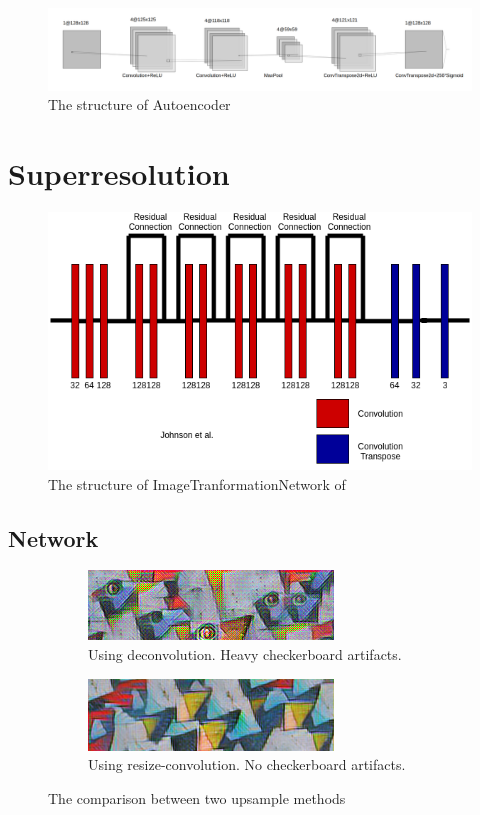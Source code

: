 \documentclass[a4paper,12pt,twoside]{report}
\begin{document}
\begin{figure}
  \centering
  \includegraphics[width=\textwidth]{autoencoder.png}
  \caption{The structure of Autoencoder}
\end{figure}

\section{Superresolution}
\begin{figure}
	\centering
	\includegraphics[scale=0.5]{ITN.png}
	\caption{The structure of ImageTranformationNetwork of \cite{johnson2016perceptual}}
\end{figure}
\subsection{Network}
\begin{figure}
	\centering
	\begin{subfigure}{0.49\textwidth}
		\centering
		\includegraphics[scale=0.6]{style_artifacts.png}
		\caption{Using deconvolution. Heavy checkerboard artifacts.}
	\end{subfigure}
	\begin{subfigure}{0.49\textwidth}
		\centering
		\includegraphics[scale=0.6]{style_clean.png}
		\caption{Using resize-convolution. No checkerboard artifacts.}
	\end{subfigure}
	\caption{The comparison between two upsample methods\cite{odena2016deconvolution}}
	\label{checkerboard}
\end{figure}
\end{document}

